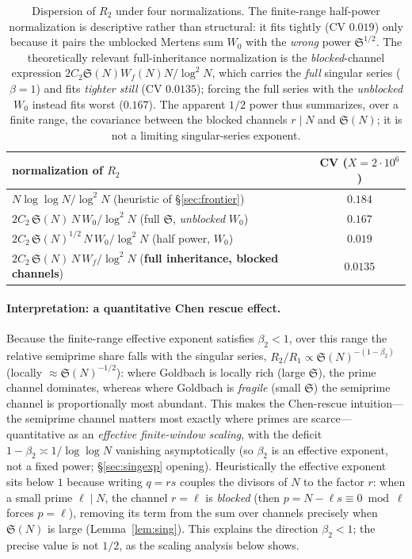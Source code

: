 \documentclass[]{interact}%
\newcommand{\sing}{\mathfrak S}
\begin{document}
\begin{table}[h]
\centering
\begin{tabular}{lc}
\toprule
normalization of $R_2$ & CV ($X=2\cdot10^{6}$)\\
\midrule
$N\log\log N/\log^2 N$ \quad(heuristic of \S\ref{sec:frontier}) & $0.184$\\
$2C_2\,\sing(N)\,N\,W_0/\log^2 N$ \quad(full $\sing$, \emph{unblocked} $W_0$) & $0.167$\\
$2C_2\,\sing(N)^{1/2}\,N\,W_0/\log^2 N$ \quad(half power, $W_0$) & $0.019$\\
$2C_2\,\sing(N)\,N\,W_f/\log^2 N$ \quad(\textbf{full inheritance, blocked channels}) & $\mathbf{0.0135}$\\
\bottomrule
\end{tabular}
\caption{Dispersion of $R_2$ under four normalizations. The finite-range half-power
normalization is descriptive rather than structural: it fits tightly (CV $0.019$) only
because it pairs the unblocked Mertens sum $W_0$ with the \emph{wrong} power $\sing^{1/2}$.
The theoretically relevant full-inheritance normalization is the \emph{blocked}-channel
expression $2C_2\sing(N)W_f(N)N/\log^2N$, which carries the \emph{full} singular series
($\beta=1$) and fits \emph{tighter still} (CV $0.0135$); forcing the full series with the
\emph{unblocked} $W_0$ instead fits worst ($0.167$). The apparent $1/2$ power thus summarizes,
over a finite range, the covariance between the blocked channels $r\mid N$ and $\sing(N)$; it
is not a limiting singular-series exponent.}
\label{tab:cv}
\end{table}

\paragraph{Interpretation: a quantitative Chen rescue effect.}
Because the finite-range effective exponent satisfies $\beta_2<1$, over this range the
relative semiprime share falls with the singular series, $R_2/R_1\propto\sing(N)^{-(1-\beta_2)}$ (locally
$\approx\sing(N)^{-1/2}$): where Goldbach is locally rich (large $\sing$), the prime
channel dominates, whereas where Goldbach is \emph{fragile} (small $\sing$) the semiprime
channel is proportionally most abundant. This makes the Chen-rescue intuition---the
semiprime channel matters most exactly where primes are scarce---quantitative as an
\emph{effective finite-window scaling}, with the deficit $1-\beta_2\asymp1/\log\log N$
vanishing asymptotically (so $\beta_2$ is an effective exponent, not a fixed power;
\S\ref{sec:singexp} opening). Heuristically the effective exponent sits below $1$ because
writing $q=rs$ couples the divisors of $N$ to the factor $r$:
when a small prime $\ell\mid N$, the channel $r=\ell$ is \emph{blocked}
(then $p=N-\ell s\equiv0\bmod\ell$ forces $p=\ell$), removing its term from the sum
over channels precisely when $\sing(N)$ is large (Lemma~\ref{lem:sing}). This
explains the direction $\beta_2<1$; the precise value is not $1/2$, as the scaling
analysis below shows.
\end{document}
